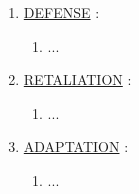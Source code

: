 \documentclass[11pt]{article}
\begin{document}
\begin{enumerate}
	\item[] \ul{DEFENSE} :
	\begin{enumerate}
		\item[] ...
	\end{enumerate}

	\item[] \ul{RETALIATION} :
	\begin{enumerate}
		\item[] ...
	\end{enumerate}

	\item[] \ul{ADAPTATION} :
	\begin{enumerate}
		\item[] ...
	\end{enumerate}

\end{enumerate}
\end{document}
